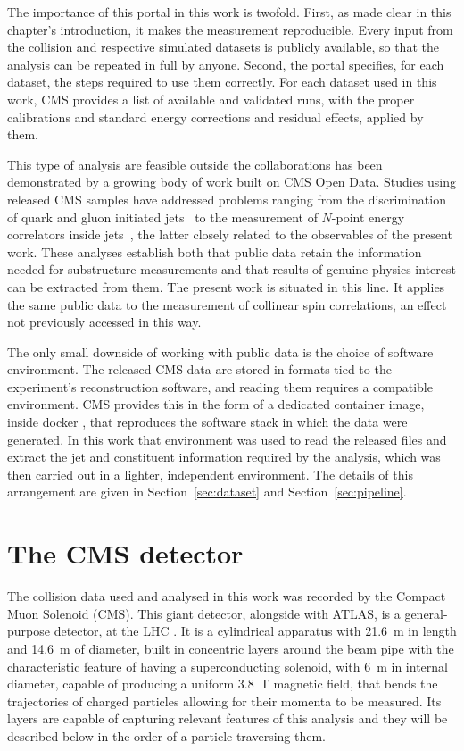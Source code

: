 The importance of this portal in this work is twofold. First, as made clear in this
chapter's introduction, it makes the measurement reproducible. Every input from 
the collision and respective simulated datasets is publicly available, so 
that the analysis can be repeated in full by anyone. Second, the portal specifies,
for each dataset, the steps required to use them correctly. For each dataset used 
in this work, CMS provides a list of available and validated runs, with the 
proper calibrations and standard energy corrections and residual effects, applied by them.

This type of analysis are feasible outside the collaborations has been demonstrated
by a growing body of work built on CMS Open Data. Studies using released CMS
samples have addressed problems ranging from the discrimination of quark and
gluon initiated jets~\cite{Komiske_2022} to the measurement of $N$-point energy
correlators inside jets~\cite{Komiske_2023}, the latter closely related to the
observables of the present work. These analyses establish both that public data
retain the information needed for substructure measurements and that results of
genuine physics interest can be extracted from them. The present work is situated
in this line. It applies the same public data to the measurement of collinear spin
correlations, an effect not previously accessed in this way.

The only small downside of working with public data is the choice of software
environment. The released CMS data are stored in formats tied to the experiment's
reconstruction software, and reading them requires a compatible environment. 
CMS provides this in the form of a dedicated container image, inside docker \cite{docker2026}, that reproduces the
software stack in which the data were generated. In this work that environment was
used to read the released files and extract the jet and constituent information
required by the analysis, which was then carried out in a lighter, independent
environment. The details of this arrangement are given in
Section~\ref{sec:dataset} and Section~\ref{sec:pipeline}.

\section{The CMS detector}
\label{sec:cms}

The collision data used and analysed in this work was recorded by the Compact Muon Solenoid (CMS).
This giant detector, alongside with ATLAS, is a general-purpose detector, at the LHC \cite{CMS:2008}.
It is a cylindrical apparatus with 21.6~m in length and 14.6~m of diameter, built in concentric
layers around the beam pipe with the characteristic feature of having a superconducting solenoid, with 
6~m in internal diameter, capable of producing a uniform 3.8~T magnetic field, that bends the trajectories
of charged particles allowing for their momenta to be measured. Its layers are capable of capturing
relevant features of this analysis and they will be described below in the order of a particle traversing them.

